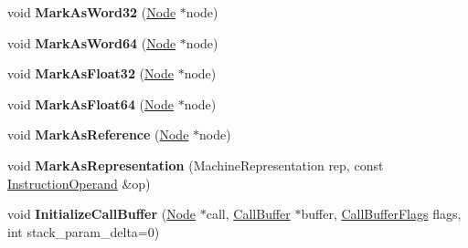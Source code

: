 \begin{DoxyCompactItemize}
\item 
void {\bfseries Mark\+As\+Word32} (\hyperlink{classv8_1_1internal_1_1compiler_1_1_node}{Node} $\ast$node)\hypertarget{classv8_1_1internal_1_1compiler_1_1_instruction_selector_a9bfc3f55cb7220dbdacc0853c1f9908a}{}\label{classv8_1_1internal_1_1compiler_1_1_instruction_selector_a9bfc3f55cb7220dbdacc0853c1f9908a}

\item 
void {\bfseries Mark\+As\+Word64} (\hyperlink{classv8_1_1internal_1_1compiler_1_1_node}{Node} $\ast$node)\hypertarget{classv8_1_1internal_1_1compiler_1_1_instruction_selector_afcaad84d0665637de2199e6802b61771}{}\label{classv8_1_1internal_1_1compiler_1_1_instruction_selector_afcaad84d0665637de2199e6802b61771}

\item 
void {\bfseries Mark\+As\+Float32} (\hyperlink{classv8_1_1internal_1_1compiler_1_1_node}{Node} $\ast$node)\hypertarget{classv8_1_1internal_1_1compiler_1_1_instruction_selector_a4c469111929e3db5e39348887974d199}{}\label{classv8_1_1internal_1_1compiler_1_1_instruction_selector_a4c469111929e3db5e39348887974d199}

\item 
void {\bfseries Mark\+As\+Float64} (\hyperlink{classv8_1_1internal_1_1compiler_1_1_node}{Node} $\ast$node)\hypertarget{classv8_1_1internal_1_1compiler_1_1_instruction_selector_a2c33e7ee0c3bfd04030dd0512d6534e2}{}\label{classv8_1_1internal_1_1compiler_1_1_instruction_selector_a2c33e7ee0c3bfd04030dd0512d6534e2}

\item 
void {\bfseries Mark\+As\+Reference} (\hyperlink{classv8_1_1internal_1_1compiler_1_1_node}{Node} $\ast$node)\hypertarget{classv8_1_1internal_1_1compiler_1_1_instruction_selector_a464cf0a410577d877fcca8e33b75d0e6}{}\label{classv8_1_1internal_1_1compiler_1_1_instruction_selector_a464cf0a410577d877fcca8e33b75d0e6}

\item 
void {\bfseries Mark\+As\+Representation} (Machine\+Representation rep, const \hyperlink{classv8_1_1internal_1_1compiler_1_1_instruction_operand}{Instruction\+Operand} \&op)\hypertarget{classv8_1_1internal_1_1compiler_1_1_instruction_selector_a0e12f241fc88e068e390ce39a86268fb}{}\label{classv8_1_1internal_1_1compiler_1_1_instruction_selector_a0e12f241fc88e068e390ce39a86268fb}

\item 
void {\bfseries Initialize\+Call\+Buffer} (\hyperlink{classv8_1_1internal_1_1compiler_1_1_node}{Node} $\ast$call, \hyperlink{structv8_1_1internal_1_1compiler_1_1_call_buffer}{Call\+Buffer} $\ast$buffer, \hyperlink{classv8_1_1base_1_1_flags}{Call\+Buffer\+Flags} flags, int stack\+\_\+param\+\_\+delta=0)\hypertarget{classv8_1_1internal_1_1compiler_1_1_instruction_selector_ac99829e210561c08df6ab90dd5d79d66}{}\label{classv8_1_1internal_1_1compiler_1_1_instruction_selector_ac99829e210561c08df6ab90dd5d79d66}


\end{DoxyCompactItemize}
